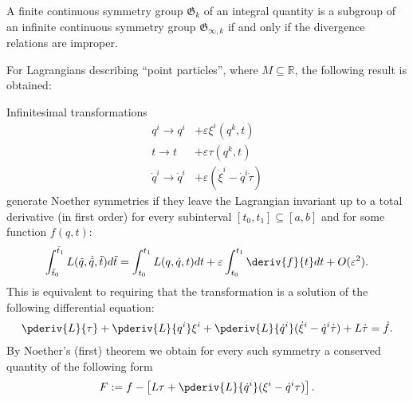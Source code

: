     \begin{theorem}\label{var:noether_third_theorem}
        A finite continuous symmetry group $\mathfrak{G}_k$ of an integral quantity is a subgroup of an infinite continuous symmetry group $\mathfrak{G}_{\infty,k}$ if and only if the divergence relations are improper.
    \end{theorem}

    For Lagrangians describing ``point particles'', where $M\subseteq\mathbb{R}$, the following result is obtained:
    \begin{example}
        Infinitesimal transformations
        \begin{align*}
            q^i\longrightarrow q^i& + \varepsilon\xi^i(q^k,t)\\
            t\longrightarrow t& + \varepsilon\tau(q^k,t)\\
            \dot{q}^i\longrightarrow\dot{q}^i& + \varepsilon(\dot{\xi}^i - \dot{q}^i\dot{\tau})
        \end{align*}
        generate Noether symmetries if they leave the Lagrangian invariant up to a total derivative (in first order) for every subinterval $[t_0, t_1]\subseteq[a, b]$ and for some function $f(q, t)$:
        \begin{gather}
            \int_{\tilde{t}_0}^{\tilde{t}_1}L(\tilde{q}, \dot{\tilde{q}}, \tilde{t})d\tilde{t} = \int_{t_0}^{t_1}L(q,\dot{q},t)dt + \varepsilon\int_{t_0}^{t_1}\deriv{f}{t}dt + O(\varepsilon^2).
        \end{gather}
        This is equivalent to requiring that the transformation is a solution of the following differential equation:
        \begin{gather}
            \pderiv{L}{\tau} + \pderiv{L}{q^i}\xi^i + \pderiv{L}{\dot{q}^i}(\dot{\xi}^i - \dot{q}^i\dot{\tau}) + L\dot{\tau} = \dot{f}.
        \end{gather}
        By Noether's (first) theorem we obtain for every such symmetry a conserved quantity of the following form
        \begin{gather}
            F := f - \left[L\tau + \pderiv{L}{\dot{q}^i}(\xi^i - \dot{q}^i\tau)\right].
        \end{gather}
    \end{example}

